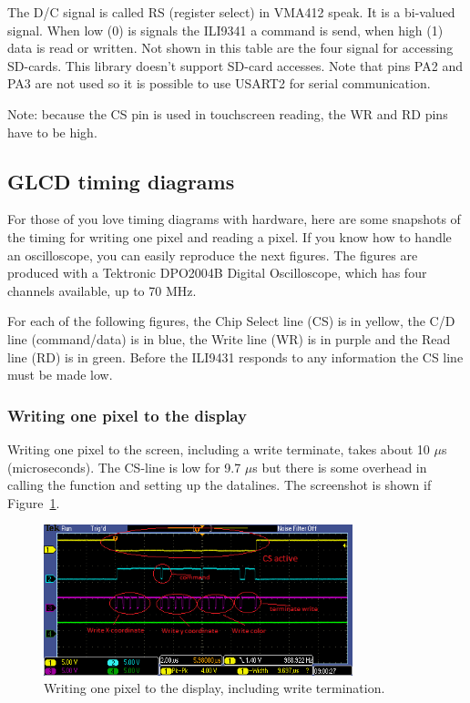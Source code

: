 \documentclass[12pt]{article}
\begin{document}
The D/C signal is called RS (register select) in VMA412  speak. It is a bi-valued signal. When low (0) is signals the ILI9341 a command is send, when high (1) data is read or written.
Not shown in this table are the four signal for accessing SD-cards. This library doesn't support SD-card accesses.
Note that pins PA2 and PA3 are not used so it is possible to use USART2 for serial communication.

Note: because the CS pin is used in touchscreen reading, the WR and RD pins have to be high.

\subsection{GLCD timing diagrams}
For those of you love timing diagrams with hardware, here are some snapshots of the timing for writing one pixel and reading a pixel. If you know how to handle an oscilloscope, you can easily reproduce the next figures. The figures are produced with a Tektronic DPO2004B Digital Oscilloscope, which has four channels available, up to 70 MHz.

For each of the following figures, the Chip Select line (CS) is in yellow, the C/D line (command/data) is in blue, the Write line (WR) is in purple and the Read line (RD) is in green. Before the ILI9431 responds to any information the CS line must be made low.

\subsubsection{Writing one pixel to the display}
Writing one pixel to the screen, including a write terminate, takes about 10 $\mu$s (microseconds). The CS-line is low for 9.7 $\mu$s but there is some overhead in calling the function and setting up the datalines. The screenshot is shown if Figure~\ref{fig:10}.

\begin{figure}[!ht]
\centering
\includegraphics[width=0.8\textwidth]{pixel_write}
\caption{Writing one pixel to the display, including write termination.}
\label{fig:10}
\end{figure}
\end{document}
